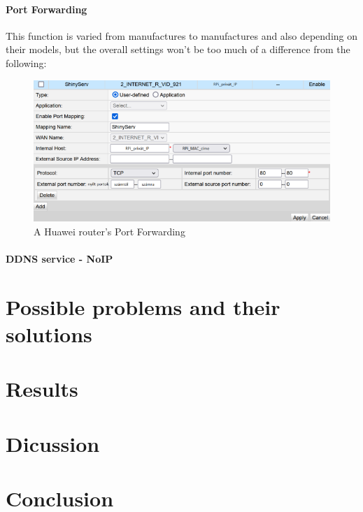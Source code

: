 \hypertarget{port-forwarding}{%
\paragraph{Port Forwarding}\label{port-forwarding}}

This function is varied from manufactures to manufactures and also
depending on their models, but the overall settings won't be too much of
a difference from the following:

\begin{figure}
\centering
\includegraphics{./media/portForwarding.png}
\caption{A Huawei router's Port Forwarding}
\end{figure}

\hypertarget{ddns-service---noip}{%
\paragraph{DDNS service - NoIP}\label{ddns-service---noip}}

\newpage

\hypertarget{possible-problems-and-their-solutions}{%
\section{Possible problems and their
solutions}\label{possible-problems-and-their-solutions}}

\newpage

\hypertarget{results}{%
\section{Results}\label{results}}

\newpage

\hypertarget{dicussion}{%
\section{Dicussion}\label{dicussion}}

\newpage

\hypertarget{conclusion}{%
\section{Conclusion}\label{conclusion}}
